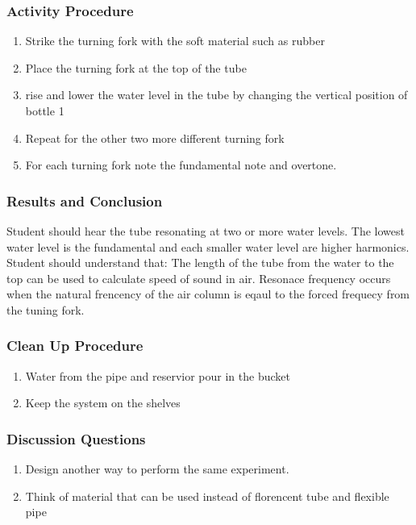 \subsubsection*{Activity Procedure}
\begin{enumerate}
\item{Strike the turning fork with the soft material such as rubber}
\item{Place the turning fork at the top of the tube}
\item{rise and lower the water level in the tube by changing the vertical position of bottle 1}
\item{Repeat for the other two more different turning fork}
\item{For each turning fork note the fundamental note and overtone.} 
\end{enumerate}

\subsubsection*{Results and Conclusion}
Student should hear the tube resonating at two or more water levels. The lowest water level is the fundamental and each smaller water level are higher harmonics.  
Student should understand that: 
The length of the tube from the water to the top can be used to calculate speed of sound in air. 
Resonace frequency occurs when the natural frencency of the air column is eqaul to the forced frequecy from the tuning fork.  

\subsubsection*{Clean Up Procedure}
\begin{enumerate}
\item{Water from the pipe and reservior pour in the bucket}
\item{Keep the system on the shelves}
\end{enumerate}

\subsubsection*{Discussion Questions}
\begin{enumerate}
\item{Design another way to perform the same experiment.} 
\item{Think of material that can be used instead of florencent tube and flexible pipe}
\end{enumerate}


